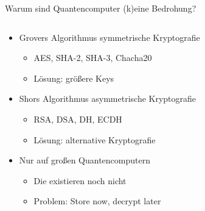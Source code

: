 \documentclass{rosenpass-beamer}
\begin{document}
\begin{frame}{Warum sind Quantencomputer (k)eine Bedrohung?}
\begin{columns}[b]
\begin{column}{.75\textwidth}
\begin{itemize}
  \item Grovers Algorithmus  symmetrische Kryptografie
  \begin{itemize}
    \item AES, SHA-2, SHA-3, Chacha20
    \item Lösung: größere Keys
  \end{itemize}
  \item Shors Algorithmus  asymmetrische Kryptografie
  \begin{itemize}
    \item RSA, DSA, DH, ECDH
    \item Lösung: alternative Kryptografie
  \end{itemize}
  \item  Nur auf großen Quantencomputern
  \begin{itemize}
    \item Die existieren noch nicht
    \item Problem: Store now, decrypt later
  \end{itemize}
\end{itemize}
\end{column}
\begin{column}{.25\textwidth}
%
\par
{}
\end{column}
\end{columns}
\end{frame}
		
\end{document}
